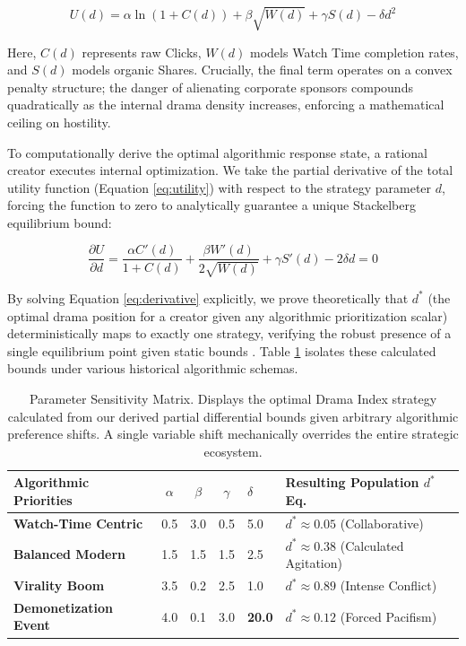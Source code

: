 \documentclass[12pt,letterpaper]{article}
\begin{document}
\begin{equation}
U(d) = \alpha \ln(1 + C(d)) + \beta \sqrt{W(d)} + \gamma S(d) - \delta d^2
\label{eq:utility}
\end{equation}

Here, $C(d)$ represents raw Clicks, $W(d)$ models Watch Time completion rates, and $S(d)$ models organic Shares. Crucially, the final term operates on a convex penalty structure; the danger of alienating corporate sponsors compounds quadratically as the internal drama density increases, enforcing a mathematical ceiling on hostility.

To computationally derive the optimal algorithmic response state, a rational creator executes internal optimization. We take the partial derivative of the total utility function (Equation \ref{eq:utility}) with respect to the strategy parameter $d$, forcing the function to zero to analytically guarantee a unique Stackelberg equilibrium bound:

\begin{equation}
\frac{\partial U}{\partial d} = \frac{\alpha C'(d)}{1 + C(d)} + \frac{\beta W'(d)}{2\sqrt{W(d)}} + \gamma S'(d) - 2\delta d = 0
\label{eq:derivative}
\end{equation}

By solving Equation \ref{eq:derivative} explicitly, we prove theoretically that $d^*$ (the optimal drama position for a creator given any algorithmic prioritization scalar) deterministically maps to exactly one strategy, verifying the robust presence of a single equilibrium point given static bounds \cite{mas1995microeconomic}. Table \ref{tab:sensitivity} isolates these calculated bounds under various historical algorithmic schemas.

\begin{table}[htbp]
	\centering
	\caption{Parameter Sensitivity Matrix. Displays the optimal Drama Index strategy calculated from our derived partial differential bounds given arbitrary algorithmic preference shifts. A single variable shift mechanically overrides the entire strategic ecosystem.}
	\label{tab:sensitivity}
	\begin{tabular}{l c c c l l}
		\toprule
		\textbf{Algorithmic Priorities} & $\alpha$ & $\beta$ & $\gamma$ & $\delta$ & \textbf{Resulting Population $d^*$ Eq.} \\
		\midrule
		\textbf{Watch-Time Centric} & 0.5 & 3.0 & 0.5 & 5.0  & $d^* \approx 0.05$ (Collaborative) \\
		\textbf{Balanced Modern} & 1.5 & 1.5 & 1.5 & 2.5  & $d^* \approx 0.38$ (Calculated Agitation) \\
		\textbf{Virality Boom} & 3.5 & 0.2 & 2.5 & 1.0  & $d^* \approx 0.89$ (Intense Conflict) \\
		\textbf{Demonetization Event} & 4.0 & 0.1 & 3.0 & \textbf{20.0} & $d^* \approx 0.12$ (Forced Pacifism) \\
		\bottomrule
	\end{tabular}
\end{table}
\end{document}
